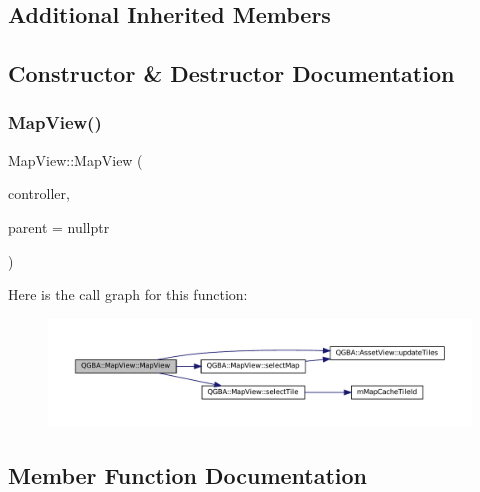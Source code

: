 \subsection*{Additional Inherited Members}


\subsection{Constructor \& Destructor Documentation}
\mbox{\label{class_q_g_b_a_1_1_map_view_a6a22b0a4093d08c0ddf2c57dd028bfe7}} 
\subsubsection{\texorpdfstring{Map\+View()}{MapView()}}
{\footnotesize\ttfamily Map\+View\+::\+Map\+View (\begin{DoxyParamCaption}\item[{std\+::shared\+\_\+ptr$<$ \mbox{\hyperlink{class_q_g_b_a_1_1_core_controller}{Core\+Controller}} $>$}]{controller,  }\item[{Q\+Widget $\ast$}]{parent = {\ttfamily nullptr} }\end{DoxyParamCaption})}

Here is the call graph for this function\+:
\nopagebreak
\begin{figure}[H]
\begin{center}
\leavevmode
\includegraphics[width=350pt]{class_q_g_b_a_1_1_map_view_a6a22b0a4093d08c0ddf2c57dd028bfe7_cgraph}
\end{center}
\end{figure}


\subsection{Member Function Documentation}
\mbox{\label{class_q_g_b_a_1_1_map_view_a6292ffd1dfcd0160d05d3872fcb3b04b}} 
